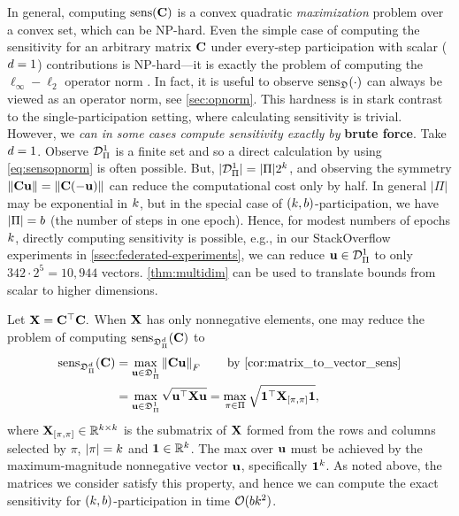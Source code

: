 \documentclass{article} %
\theoremstyle{named}
\begin{document}
 In general, computing $\operatorname{sens}(\mathbf{C})$ is a convex quadratic \emph{maximization} problem over a convex set, which can be NP-hard. Even the simple case of computing the sensitivity for an arbitrary matrix $\mathbf{C}$ under every-step participation with scalar ($d = 1$) contributions is NP-hard---it is exactly the problem of computing the $\ell_\infty\!-\!\ell_2$ operator norm \citep{tropp_thesis}. In fact, it is useful to observe $\operatorname{sens}_{\mathfrak{D}}(\cdot)$ can always be viewed as an operator norm, see \cref{sec:opnorm}. This hardness is in stark contrast to the single-participation setting, where calculating sensitivity is trivial. However, we \emph{can in some cases compute sensitivity exactly by} \textbf{brute force}. Take $d=1$. Observe $\mathcal{D}^1_\Pi$ is a finite set and so a direct calculation by using \cref{eq:sensopnorm} is often possible. But, $|\mathcal{D}^1_\Pi| = |\Pi|2^k$, and observing the symmetry $\| \mathbf{C} \mathbf{u} \| = \| \mathbf{C} (-\mathbf{u}) \|$ can reduce the computational cost only by half. In general $|\Pi|$ may be exponential in $k$, but in the special case of $(k,b)$-participation, we have $|\Pi| = b$ (the number of steps in one epoch). Hence, for modest numbers of epochs $k$, directly computing sensitivity is possible, e.g., in our StackOverflow experiments in \cref{ssec:federated-experiments}, we can reduce $\mathbf{u} \in \mathcal{D}^1_\Pi$ to only $342\cdot2^5 = 10,944$ vectors. \cref{thm:multidim} can be used to translate bounds from scalar to higher dimensions.%

Let $\mathbf{X} = \mathbf{C}^\top\mathbf{C}.$ When $\mathbf{X}$ has only nonnegative elements, one may reduce the problem of computing $\operatorname{sens}_{\mathfrak{D}^d_\Pi}(\mathbf{C})$ to
\begin{align}
 \sens_{\deltaset^\mdim_\Pi}(\bfC) \nonumber
 &= \max_{\contrib \in \deltaset^1_\Pi} \lfrob{\bfC\contrib}  \quad\quad \text{by \cref{cor:matrix_to_vector_sens}}\\
 &= \max_{\contrib \in \deltaset^1_\Pi} \sqrt{\contrib\tp \bfX \contrib  }
 = \max_{\pi \in \Pi} \sqrt{\mathbf{1}\tp\bfX\idx{\pi}{\pi}\mathbf{1}},\label{eq:bruteforce}
\end{align}
where $\mathbf{X}_{[\pi, \pi]} \in \mathbb{R}^{k \times k}$ is the submatrix of $\mathbf{X}$ formed from the rows and columns selected by $\pi$, $|\pi| = k$ and $\mathbf{1} \in \mathbb{R}^k$. The max over $\mathbf{u}$ must be achieved by the maximum-magnitude nonnegative vector $\mathbf{u}$, specifically $\mathbf{1}^k$. As noted above, the matrices we consider satisfy this property, and hence we can compute the exact sensitivity for $(k,b)$-participation in time $\mathcal{O}(bk^2)$.
\end{document}
